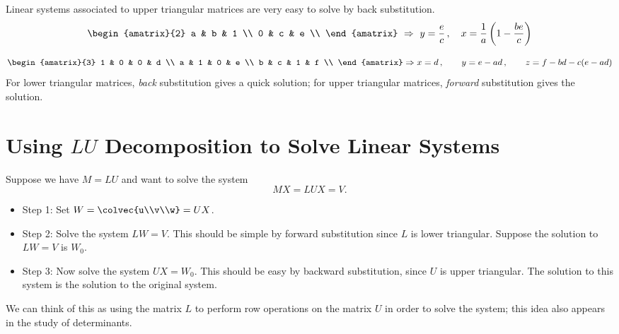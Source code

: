 \begin{example}
Linear systems associated to upper triangular matrices are very easy to solve by back substitution.
\[
\begin{amatrix}{2}
a & b & 1 \\
0 & c & e \\
\end{amatrix} \ \Rightarrow \ y=\frac{e}{c}\, , \quad x=\frac{1}{a}\left(1-\frac{be}{c}\right)
\]

\[
\begin{amatrix}{3}
1 & 0 & 0 & d \\
a & 1 & 0 & e \\
b & c & 1 & f \\
\end{amatrix} \Rightarrow x=d\, , \qquad y=e-ad\, , \qquad z=f-bd-c(e-ad)
\]
For lower triangular matrices, \emph{back} substitution gives a quick solution; for upper triangular matrices, \emph{forward} substitution gives the solution.
\end{example}





\section{Using $LU$ Decomposition to Solve Linear Systems}

Suppose we have $M=LU$ and want to solve the system
\[
MX=LUX=V.
\]

\begin{itemize}
\item{Step 1:} Set $W=\colvec{u\\v\\w}=UX$.  

\item{Step 2:} Solve the system $LW=V$.  This should be simple by forward substitution since $L$ is lower triangular.  Suppose the solution to $LW=V$ is $W_0$.  

\item{Step 3:} Now solve the system $UX=W_0$.  This should be easy by backward substitution, since $U$ is upper triangular.  The solution to this system is the solution to the original system.
\end{itemize}
We can think of this as using the matrix $L$ to perform row operations on the matrix $U$ in order to solve the system; this idea also appears in the  study of determinants.

